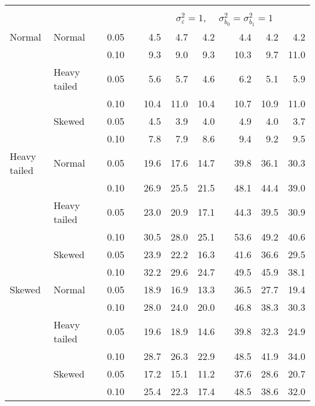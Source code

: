 \begin{table}[ht]
\begin{scriptsize}
\begin{center}
\begin{tabular}{ll p{.1cm} c p{.1cm} rrr p{.1cm} rrr}
&&&&&&&&&&&\\
& && && \multicolumn{7}{c}{$\sigma_{\varepsilon}^2 = 1$, \ \ $\sigma_{b_0}^2 = \sigma_{b_1}^2 = 1$} \\ \cline{6-12}
Normal       & Normal       && 0.05 &&   4.5 & 4.7 & 4.2 &   & 4.4 & 4.2 & 4.2 \\ 
             &              && 0.10 &&   9.3 & 9.0 & 9.3 &   & 10.3 & 9.7 & 11.0 \\ 
             & Heavy tailed && 0.05 &&   5.6 & 5.7 & 4.6 &   & 6.2 & 5.1 & 5.9 \\ 
             &              && 0.10 &&   10.4 & 11.0 & 10.4 &   & 10.7 & 10.9 & 11.0 \\ 
             & Skewed       && 0.05 &&   4.5 & 3.9 & 4.0 &   & 4.9 & 4.0 & 3.7 \\ 
             &              && 0.10 &&   7.8 & 7.9 & 8.6 &   & 9.4 & 9.2 & 9.5 \\ 
Heavy tailed & Normal       && 0.05 &&   19.6 & 17.6 & 14.7 &   & 39.8 & 36.1 & 30.3 \\ 
             &              && 0.10 &&   26.9 & 25.5 & 21.5 &   & 48.1 & 44.4 & 39.0 \\ 
             & Heavy tailed && 0.05 &&   23.0 & 20.9 & 17.1 &   & 44.3 & 39.5 & 30.9 \\ 
             &              && 0.10 &&   30.5 & 28.0 & 25.1 &   & 53.6 & 49.2 & 40.6 \\ 
             & Skewed       && 0.05 &&   23.9 & 22.2 & 16.3 &   & 41.6 & 36.6 & 29.5 \\ 
             &              && 0.10 &&   32.2 & 29.6 & 24.7 &   & 49.5 & 45.9 & 38.1 \\ 
Skewed       & Normal       && 0.05 &&   18.9 & 16.9 & 13.3 &   & 36.5 & 27.7 & 19.4 \\ 
             &              && 0.10 &&   28.0 & 24.0 & 20.0 &   & 46.8 & 38.3 & 30.3 \\ 
             & Heavy tailed && 0.05 &&   19.6 & 18.9 & 14.6 &   & 39.8 & 32.3 & 24.9 \\ 
             &              && 0.10 &&   28.7 & 26.3 & 22.9 &   & 48.5 & 41.9 & 34.0 \\ 
             & Skewed       && 0.05 &&   17.2 & 15.1 & 11.2 &   & 37.6 & 28.6 & 20.7 \\ 
             &              && 0.10 &&   25.4 & 22.3 & 17.4 &   & 48.5 & 38.6 & 32.0 \\ 



\end{tabular}
\end{center}
\end{scriptsize}
\end{table}

